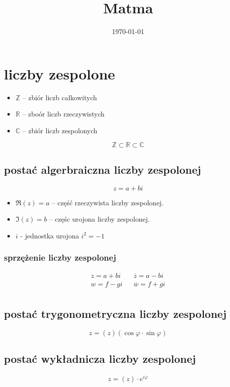 \documentclass[11pt]{article}
\date{\today}
\title{Matma}
\begin{document}
\maketitle
\tableofcontents


\section{liczby zespolone}
\label{sec:org859d6f4}
\begin{itemize}
\item \(\mathbb{Z}\) -- zbiór liczb całkowitych
\item \(\mathbb{R}\) -- zboór liczb rzeczywistych
\item \(\mathbb{C}\) -- zbiór liczb zespolonych
\end{itemize}
$$\mathbb{Z} \subset \mathbb{R} \subset \mathbb{C}$$
\subsection{postać algerbraiczna liczby zespolonej}
\label{sec:orgc484035}
$$z=a+bi$$

\begin{itemize}
\item \(\Re(z) = a\) -- część rzeczywista liczby zespolonej.
\item \(\Im(z) = b\) -- częśc urojona liczby zespolonej.
\item \(i\) - jednostka urojona \(i^2=-1\)
\end{itemize}
\subsubsection{sprzężenie liczby zespolonej}
\label{sec:org23c4343}
\begin{latex}
\begin{align*}
  z=a+bi && \overline{z}=a-bi \\
  w=f-gi && \overline{w}=f+gi \\
\end{align*}
\end{latex}

\subsection{postać trygonometryczna liczby zespolonej}
\label{sec:org77b1aca}
$$z=(z)(\cos\varphi \cdot \sin\varphi)$$
\subsection{postać wykładnicza liczby zespolonej}
\label{sec:org5a77591}
$$z=(z) \cdot e^{i\varphi}$$
\end{document}
